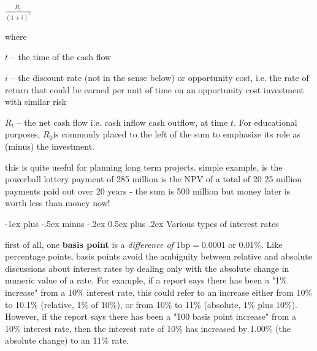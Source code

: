 \documentclass[10pt,landscape]{article}
\makeatletter
\renewcommand{\section}{\@startsection{section}{1}{0mm}%
                                {-1ex plus -.5ex minus -.2ex}%
                                {0.5ex plus .2ex}%
                                {\normalfont\large\bfseries}}
\makeatother
\begin{document}
\begin{multicols}{3}
$\frac{R_t}{(1+i)  ^{t}}$

\vspace{0.15cm}

where

\vspace{0.15cm}

$t$ – the time of the cash flow

\vspace{0.15cm}

$i$ – the discount rate (not in the sense below) or opportunity cost, i.e. the rate of return that could be earned per unit of time on an opportunity cost investment with similar risk

\vspace{0.15cm}

$R_t$ – the net cash flow i.e. cash inflow cash outflow, at time $t$. For educational purposes, $R_0$is commonly placed to the left of the sum to emphasize its role as (minus) the investment.

\vspace{0.15cm}

this is quite useful for planning long term projects. simple example, is the powerball lottery payment of 285 million is the NPV of a total of 20 25 million payments paid out over 20 years - the sum is 500 million but money later is worth less than money now!

\vspace{0.15cm}

\section{Various types of interest rates}

\vspace{0.25cm}

first of all, one \textbf{basis point} is a \textit{difference of} $1\textrm{bp}= 0.0001$ or $0.01\%$. Like percentage points, basis points avoid the ambiguity between relative and absolute discussions about interest rates by dealing only with the absolute change in numeric value of a rate. For example, if a report says there has been a "1\% increase" from a 10\% interest rate, this could refer to an increase either from 10\% to 10.1\% (relative, 1\% of 10\%), or from 10\% to 11\% (absolute, 1\% plus 10\%). However, if the report says there has been a "100 basis point increase" from a 10\% interest rate, then the interest rate of 10\% has increased by 1.00\% (the absolute change) to an 11\% rate.


\end{multicols}
\end{document}
